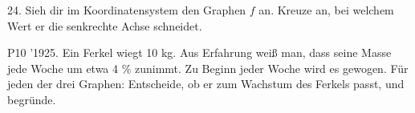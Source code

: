 \documentclass[11pt]{article}
\begin{document}
\pfgruppe{}
\begin{pfaufg}{}{24.}{}
Sieh dir im Koordinatensystem den Graphen $f$ an. Kreuze an, bei welchem Wert er die senkrechte Achse schneidet. 
\par\smallskip\noindent \begin{ksys}[xmin=0,xmax=10,ymin=0,ymax=700,xstep=1,ystep=100,xlabel=t in Jahren,ylabel=Wert,ablesen]    \end{ksys}\par
{}
\end{pfaufg}
\pfgruppe{}
\begin{pfaufg}{P10 ’19}{\llap{\textasteriskcentered\,}25.}{}
Ein Ferkel wiegt 10 kg. Aus Erfahrung weiß man, dass seine Masse jede Woche um etwa 4 \% zunimmt. Zu Beginn jeder Woche wird es gewogen. Für jeden der drei Graphen: Entscheide, ob er zum Wachstum des Ferkels passt, und begründe.

\end{pfaufg}
\end{document}
